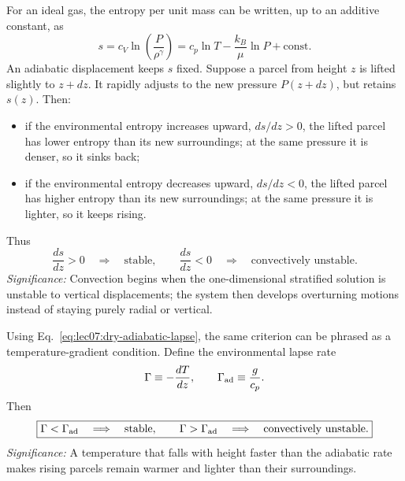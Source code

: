 For an ideal gas, the entropy per unit mass can be written, up to an additive
constant, as
\begin{equation}
    s = c_V\ln\!\left(\frac{P}{\rho^\gamma}\right)
    = c_p\ln T - \frac{k_B}{\mu}\ln P + \text{const}.
    \label{eq:lec07:entropy-ideal-gas}
\end{equation}
An adiabatic displacement keeps $s$ fixed. Suppose a parcel from height $z$ is
lifted slightly to $z+dz$. It rapidly adjusts to the new pressure
$P(z+dz)$, but retains $s(z)$. Then:
\begin{itemize}
    \item if the environmental entropy increases upward, $ds/dz>0$, the
    lifted parcel has lower entropy than its new surroundings; at the same
    pressure it is denser, so it sinks back;
    \item if the environmental entropy decreases upward, $ds/dz<0$, the
    lifted parcel has higher entropy than its new surroundings; at the same
    pressure it is lighter, so it keeps rising.
\end{itemize}
Thus
\begin{equation}
    \boxed{
    \frac{ds}{dz}>0 \quad \Longrightarrow \quad \text{stable},
    \qquad
    \frac{ds}{dz}<0 \quad \Longrightarrow \quad \text{convectively unstable}.
    }
    \label{eq:lec07:entropy-stability}
\end{equation}
\textit{Significance:} Convection begins when the one-dimensional stratified
solution is unstable to vertical displacements; the system then develops
overturning motions instead of staying purely radial or vertical.

Using Eq.~\eqref{eq:lec07:dry-adiabatic-lapse}, the same criterion can be
phrased as a temperature-gradient condition. Define the environmental lapse
rate
\begin{equation}
    \Gamma \equiv -\frac{dT}{dz},
    \qquad
    \Gamma_{\rm ad} \equiv \frac{g}{c_p}.
    \label{eq:lec07:lapse-definitions}
\end{equation}
Then
\begin{equation}
    \boxed{
    \Gamma < \Gamma_{\rm ad} \quad \Longrightarrow \quad \text{stable},
    \qquad
    \Gamma > \Gamma_{\rm ad} \quad \Longrightarrow \quad \text{convectively unstable}.
    }
    \label{eq:lec07:lapse-stability}
\end{equation}
\textit{Significance:} A temperature that falls with height faster than the
adiabatic rate makes rising parcels remain warmer and lighter than their
surroundings.

